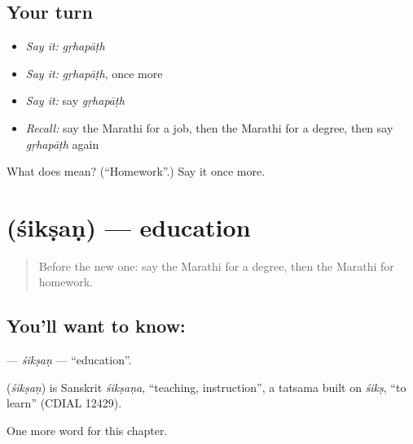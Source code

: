 \subsection*{Your turn}
\begin{itemize}
\raggedright
  \item \emph{Say it:} \emph{gṛhapāṭh}
  \item \emph{Say it:} \emph{gṛhapāṭh}, once more
  \item \emph{Say it:} say \emph{gṛhapāṭh}
  \item \emph{Recall:} say the Marathi for a job, then the Marathi for a degree, then say \emph{gṛhapāṭh} again
\end{itemize}

\begin{tcolorbox}[breakable,colback=teal!4,colframe=teal!35!black,title={Before you move on}]
What does  mean? (\textquotedblleft{}Homework\textquotedblright{}.) Say it once more.
\end{tcolorbox}
\section[\texorpdfstring{\mr{शिक्षण} (śikṣaṇ)}{शिक्षण (śikṣaṇ)}]{ (śikṣaṇ) — education}

\label{lesson:MR-C247-siksan}



\begin{quote}
Before the new one: say the Marathi for a degree, then the Marathi for homework.
\end{quote}

\subsection*{You'll want to know: }
\textbf{} — \emph{śikṣaṇ} — \textquotedblleft{}education\textquotedblright{}.

\begin{cousinweb}
\textbf{} (\emph{śikṣaṇ}) is Sanskrit \emph{śikṣaṇa}, \textquotedblleft{}teaching, instruction\textquotedblright{}, a tatsama built on \emph{śikṣ}, \textquotedblleft{}to learn\textquotedblright{} (CDIAL 12429).
\end{cousinweb}

\begin{grammarlens}[title={What you've built}]
One more word for this chapter.
\end{grammarlens}

